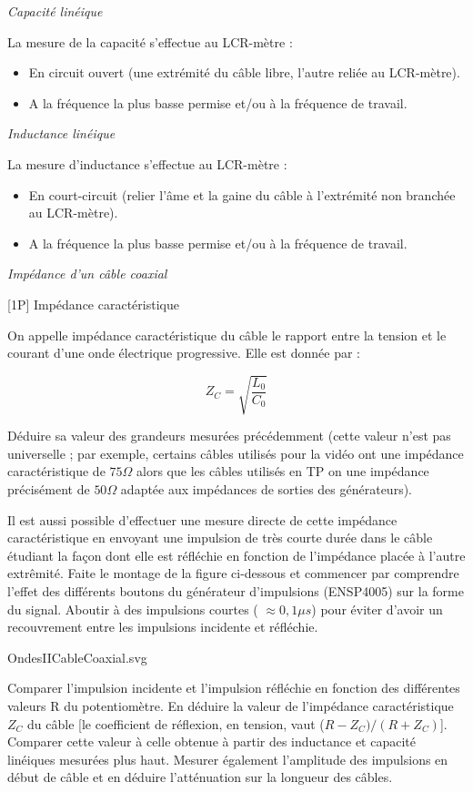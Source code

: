 \documentclass{article}%
\begin{document}
\textit{Capacité linéique}

La mesure de la capacité s'effectue au LCR-mètre :
\begin{itemize}
	\item    En circuit ouvert (une extrémité du câble libre, l'autre reliée au LCR-mètre).
	\item    A la fréquence la plus basse permise et/ou à la fréquence de travail.
\end{itemize}

\textit{Inductance linéique}

La mesure d'inductance s'effectue au LCR-mètre :

\begin{itemize}
	\item    En court-circuit (relier l'âme et la gaine du câble à l’extrémité non branchée au LCR-mètre).
	\item    A la fréquence la plus basse permise et/ou à la fréquence de travail.
\end{itemize}

\textit{Impédance d'un câble coaxial}

[1P] Impédance caractéristique

On appelle impédance caractéristique du câble le rapport entre la tension et le courant d'une onde électrique progressive. Elle est donnée par :

\[ Z_C = \sqrt{\frac{L_0 }{C_0 }}\]

Déduire sa valeur des grandeurs mesurées précédemment (cette valeur n'est pas universelle ; par exemple, certains câbles utilisés pour la vidéo ont une impédance caractéristique de $75 \Omega$ alors que les câbles utilisés en TP on une impédance précisément de $50 \Omega$ adaptée aux impédances de sorties des générateurs).

Il est aussi possible d'effectuer une mesure directe de cette impédance caractéristique en envoyant une impulsion de très courte durée dans le câble étudiant la façon dont elle est réfléchie en fonction de l'impédance placée à l'autre extrêmité. Faite le montage de la figure ci-dessous et commencer par comprendre l'effet des différents boutons du générateur d'impulsions (ENSP4005) sur la forme du signal. Aboutir à des impulsions courtes ( $\approx 0,1  \mu s$) pour éviter d'avoir un recouvrement entre les impulsions incidente et réfléchie.

OndesIICableCoaxial.svg

Comparer l'impulsion incidente et l'impulsion réfléchie en fonction des différentes valeurs R du potentiomètre. En déduire la valeur de l'impédance caractéristique $Z_{C}$ du câble [le coefficient de réflexion, en tension, vaut ($R-Z_{C})/(R+Z_{C})$]. Comparer cette valeur à celle obtenue à partir des inductance et capacité linéiques mesurées plus haut. Mesurer également l'amplitude des impulsions en début de câble et en déduire l'atténuation sur la longueur des câbles.
\end{document}
